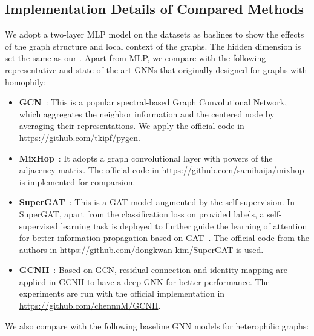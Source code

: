 \subsection{Implementation Details of Compared Methods}
\label{app:baseline}
We adopt a two-layer MLP model on the datasets as baslines to show the effects of the graph structure and local context of the graphs. The hidden dimension is set the same as our {\method}. Apart from MLP,
we compare {\method} with the following representative and state-of-the-art GNNs that originally designed for graphs with homophily:  
\begin{itemize}[leftmargin=*]
    \item \textbf{GCN}~\cite{kipf2016semi}: This is a popular spectral-based Graph Convolutional Network, which aggregates the neighbor information and the centered node by averaging their representations. We apply the official code in \url{https://github.com/tkipf/pygcn}.
    \item \textbf{MixHop}~\cite{abu2019mixhop}: It adopts a graph convolutional layer with powers of the adjacency matrix. The official code in \url{https://github.com/samihaija/mixhop} is implemented for comparsion.
    \item \textbf{SuperGAT}~\cite{kim2020find}: This is a GAT model augmented by the self-supervision. In SuperGAT, apart from the classification loss on provided labels, a self-supervised learning task is deployed to further guide the learning of attention for better information propagation based on GAT~\cite{velivckovic2017graph}. The official code from the authors in \url{https://github.com/dongkwan-kim/SuperGAT} is used.
    \item \textbf{GCNII}~\cite{chen2020simple}: Based on GCN, residual connection and identity mapping are applied in GCNII to have a deep GNN for better performance. The experiments are run with the official implementation in \url{https://github.com/chennnM/GCNII}.
\end{itemize}
We also compare {\method} with the following baseline GNN models for heterophilic graphs:
